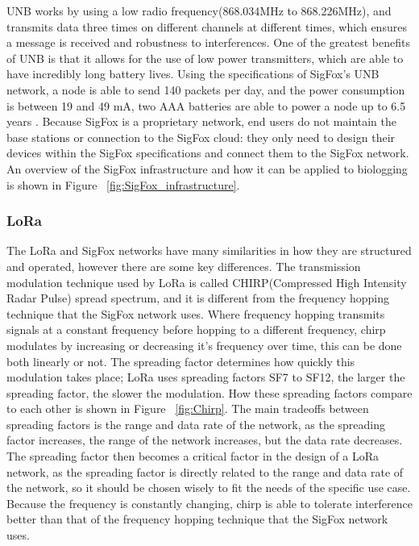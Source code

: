 \documentclass[sigplan,screen,nonacm]{acmart}
\begin{document}
UNB works by using a low radio frequency(868.034MHz to 868.226MHz), and transmits data three 
times on different channels at different times, which ensures a message is received 
and robustness to interferences\cite{LavricSigfoxCommunication}. One of the greatest 
benefits of UNB is that it allows for the use of low power transmitters, which are able 
to have incredibly long battery lives. Using the specifications of SigFox's UNB 
network, a node is able to send 140 packets per day, and the power consumption is 
between 19 and 49 mA, two AAA batteries are able to power a node up to 6.5 years
\cite{LavricSigfoxCommunication}. Because SigFox is a proprietary network, end users 
do not maintain the base stations or connection to the SigFox cloud: they only need to 
design their devices within the SigFox specifications and connect them to the SigFox network. 
An overview of the SigFox infrastructure and how it can be applied to biologging 
is shown in Figure ~\ref{fig:SigFox_infrastructure}.

\subsubsection{LoRa}
\label{subsec:LoRa}

The LoRa and SigFox networks have many similarities in how they are structured 
and operated, however there are some key differences. The transmission modulation 
technique used by LoRa is called CHIRP(Compressed High Intensity Radar Pulse) spread 
spectrum, and it is different from the frequency hopping technique that the SigFox 
network uses. Where frequency hopping transmits signals at a constant frequency before 
hopping to a different frequency, chirp modulates by increasing or decreasing it's 
frequency over time, this can be done both linearly or not\cite{ghoslya2017lora}. The 
spreading factor determines how quickly this modulation takes place; LoRa uses spreading 
factors SF7 to SF12, the larger the spreading factor, the slower the modulation.
How these spreading factors compare to each other is shown in Figure ~\ref{fig:Chirp}. 
The main tradeoffs between spreading factors is the range and data rate of the network, as the 
spreading factor increases, the range of the network increases, but the data rate decreases\cite{erturk2019survey}. 
The spreading factor then becomes a critical factor in the design of a LoRa network, as 
the spreading factor is directly related to the range and data rate of the network, so it should 
be chosen wisely to fit the needs of the specific use case. Because the frequency is constantly 
changing, chirp is able to tolerate interference better than that of the frequency hopping 
technique that the SigFox network uses.
\end{document}
